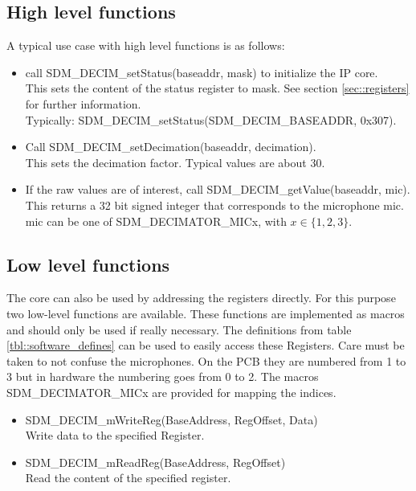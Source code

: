 \subsection{High level functions}
A typical use case with high level functions is as follows:
\begin{itemize}
	\item call SDM\_DECIM\_setStatus(baseaddr, mask) to initialize the IP core. \\
		This sets the content of the status register to mask. See section \ref{sec::registers} for further information.\\
		Typically: SDM\_DECIM\_setStatus(SDM\_DECIM\_BASEADDR, 0x307).
	\item Call SDM\_DECIM\_setDecimation(baseaddr, decimation). \\
		This sets the decimation factor. Typical values are about 30.
	\item If the raw values are of interest, call SDM\_DECIM\_getValue(baseaddr, mic).\\
		This returns a 32 bit signed integer that corresponds to the microphone mic. \\
		mic can be one of SDM\_DECIMATOR\_MICx, with $x\in\{1,2,3\}$.
\end{itemize}

\subsection{Low level functions}
The core can also be used by addressing the registers directly.
For this purpose two low-level functions are available.
These functions are implemented as macros and should only be used if really necessary.
The definitions from table \ref{tbl::software_defines} can be used to easily access these Registers.
Care must be taken to not confuse the microphones. 
On the PCB they are numbered from 1 to 3 but in hardware the numbering goes from 0 to 2.
The macros SDM\_DECIMATOR\_MICx are provided for mapping the indices.

\begin{itemize}
	\item SDM\_DECIM\_mWriteReg(BaseAddress, RegOffset, Data) \\
		Write data to the specified Register. 
	\item SDM\_DECIM\_mReadReg(BaseAddress, RegOffset) \\		
		Read the content of the specified register.
\end{itemize}

